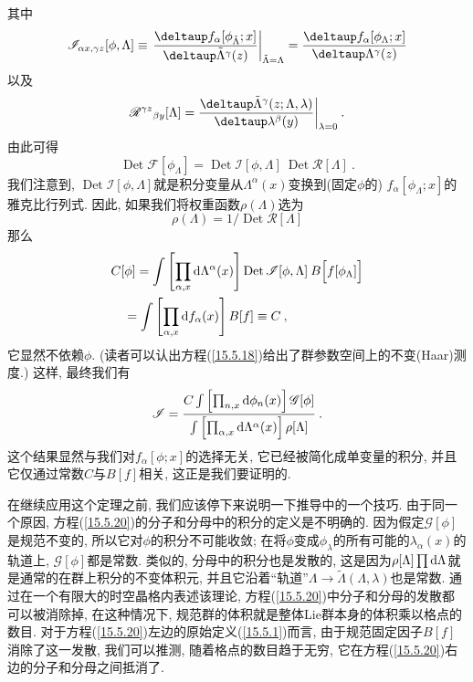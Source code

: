 其中\begin{equation}
\mathscr{I}_{\alpha x,\gamma z}[\phi ,\Lambda ]\equiv \left. \frac{\deltaup
f_{\alpha }[\phi _{\tilde{\Lambda}};x]}{\deltaup \tilde{\Lambda}^{\gamma }(z)}%
\right\vert _{\tilde{\Lambda}=\Lambda }=\frac{\deltaup f_{\alpha }[\phi
_{\Lambda };x]}{\deltaup \Lambda ^{\gamma }(z)}  \label{15.5.15}
\end{equation}%
以及
\begin{equation}
\mathscr{R}^{\gamma z}{}_{\beta y}[ \Lambda ]= \frac{\deltaup
\tilde{\Lambda}^{\gamma }(z;\Lambda ,\lambda )}{\deltaup \lambda ^{\beta }(y)}%
\bigg\vert _{\lambda =0}\:.   \label{15.5.16}
\end{equation}%
由此可得
\begin{equation}
\operatorname{Det} \mathscr{F}[ \phi _{\Lambda }]=\operatorname{Det} \mathscr{I}[ \phi
,\Lambda ]\:\operatorname{Det} \mathscr{R}[\Lambda ]\:.   \label{15.5.17}
\end{equation}%
我们注意到, $\operatorname{Det} \mathscr{I}[ \phi
,\Lambda ]$就是积分变量从$\Lambda^{\alpha }(x)$变换到(固定$\phi$的) $f_{\alpha }[\phi _{\Lambda };x]$的雅克比行列式. 因此, 如果我们将权重函数$\rho (\Lambda )$选为%
\begin{equation}
\rho (\Lambda )=1\Big/\operatorname{Det} \mathscr{R}[ \Lambda ]  \label{15.5.18}
\end{equation}%
那么\begin{align}
&C[\phi ] =\int \left[ \prod_{\alpha ,x}\dif\Lambda ^{\alpha }(x)\right] \operatorname{Det} %
\mathscr{I}[ \phi ,\Lambda ]\:B\Big[ f[\phi _{\Lambda }]\Big]
\nonumber \\
&\quad=\int \left[ \prod_{\alpha ,x}\dif f_{\alpha }(x)\right] B[f]\equiv C\:, 
\label{15.5.19}
\end{align}%
它显然不依赖$\phi$. (读者可以认出方程(\ref{15.5.18})给出了群参数空间上的不变(Haar)测度.) 这样, 最终我们有\begin{equation}
\mathscr{I}=\frac{C\int \left[ \prod_{n,x}\dif\phi _{n}(x)\right] \mathscr{G}%
[ \phi ]}{\int \left[ \prod_{\alpha ,x}\dif\Lambda ^{\alpha }(x)\right]
\rho [ \Lambda ]}\:.   \label{15.5.20}
\end{equation}%
这个结果显然与我们对$f_{\alpha }[\phi ;x]$的选择无关, 它已经被简化成单变量的积分, 并且它仅通过常数$C$与$B[f]$相关, 这正是我们要证明的.

在继续应用这个定理之前, 我们应该停下来说明一下推导中的一个技巧. 由于同一个原因, 方程(\ref{15.5.20})的分子和分母中的积分的定义是不明确的. 
因为假定$\mathscr{G}[ \phi ]$是规范不变的, 所以它对$\phi$的积分不可能收敛; 
在将$\phi $变成$\phi _{\lambda }$的所有可能的$\lambda _{\alpha}(x)$的轨道上, $\mathscr{G}[\phi]$都是常数.
类似的, 分母中的积分也是发散的, 这是因为$\rho[ \Lambda ]\prod \mathrm{d}\Lambda $就是通常的在群上积分的不变体积元,
并且它沿着``轨道''$\Lambda \rightarrow \tilde{\Lambda}(\Lambda ,\lambda )$也是常数. 通过在一个有限大的时空晶格内表述该理论, 
方程(\ref{15.5.20})中分子和分母的发散都可以被消除掉, 在这种情况下, 规范群的体积就是整体Lie群本身的体积乘以格点的数目.
对于方程(\ref{15.5.20})左边的原始定义(\ref{15.5.1})而言, 由于规范固定因子$B[f]$消除了这一发散, 
我们可以推测, 随着格点的数目趋于无穷, 它在方程(\ref{15.5.20})右边的分子和分母之间抵消了.

